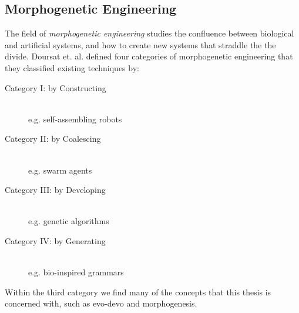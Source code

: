 \subsection{Morphogenetic Engineering}
The field of \textit{morphogenetic engineering} \cite{doursat2013review} studies the confluence between biological and artificial systems, and how to create new systems that straddle the the divide.
Doursat et. al. defined four categories of morphogenetic engineering that they classified existing techniques by:

\begin{description}
    \item[Category I: by Constructing] ~\\
        e.g. self-assembling robots
    \item[Category II: by Coalescing] ~\\
        e.g. swarm agents
    \item[Category III: by Developing] ~\\
        e.g. genetic algorithms
    \item[Category IV: by Generating] ~\\
        e.g. bio-inspired grammars
\end{description}

Within the third category we find many of the concepts that this thesis is concerned with, such as evo-devo and morphogenesis.
